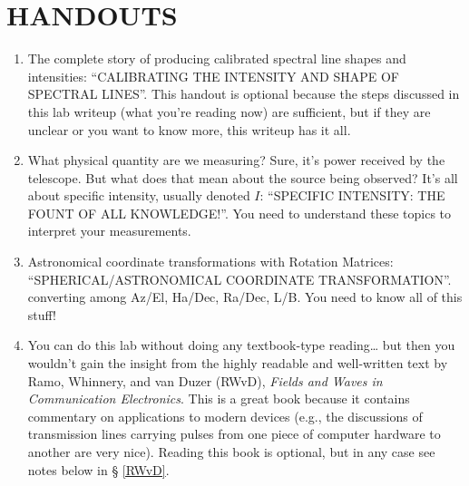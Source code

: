 \documentclass[11pt,preprint]{aastex}
\begin{document}
\section{HANDOUTS} \label{handouts}
\begin{enumerate}

\item The complete story of producing calibrated spectral line shapes
  and intensities: ``CALIBRATING THE INTENSITY AND SHAPE OF SPECTRAL
  LINES''. This handout is optional because the steps discussed in
  this lab writeup (what you're reading now) are sufficient, but
  if they are unclear or you want to know more, this writeup has it all.

\item What physical quantity are we measuring? Sure, it's power received
  by the telescope. But what does that mean about the source being
  observed? It's all about specific intensity, usually denoted $I$:
  ``SPECIFIC INTENSITY: THE FOUNT OF ALL KNOWLEDGE!''. 
  You need to understand these topics to interpret your measurements.

\item Astronomical coordinate transformations with Rotation Matrices:
  ``SPHERICAL/ASTRONOMICAL COORDINATE
  TRANSFORMATION''. converting among Az/El, Ha/Dec, Ra/Dec, L/B. 
    You need to know all of this stuff!

\item You can do this lab without doing any textbook-type reading\dots
  but then you wouldn't gain the insight from the highly readable and
  well-written text by Ramo, Whinnery, and van Duzer (RWvD), {\it Fields
    and Waves in Communication Electronics}. This is a great book
  because it contains commentary on applications to modern devices
  (e.g., the discussions of transmission lines carrying pulses from one
  piece of computer hardware to another are very nice).  Reading this
  book is optional, but in any case see notes below in \S
  \ref{RWvD}.

\end{enumerate}
\end{document}
